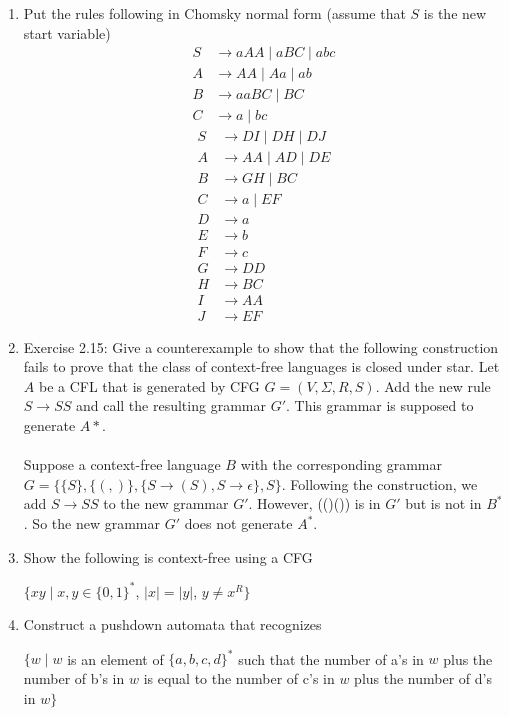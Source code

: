 \documentclass{article}
\begin{document}
\begin{enumerate}
        \item Put the rules following in Chomsky normal form (assume that $S$ is the new start variable)
            \begin{align*}
                S&\rightarrow aAA \mid aBC \mid abc\\
                A&\rightarrow AA \mid Aa \mid ab\\
                B&\rightarrow aaBC \mid BC\\
                C&\rightarrow a\mid bc
            \end{align*}
            \begin{align*}
                S&\rightarrow DI \mid DH \mid DJ\\
                A&\rightarrow AA \mid AD \mid DE\\
                B&\rightarrow GH \mid BC\\
                C&\rightarrow a \mid EF\\
                D&\rightarrow a\\
                E&\rightarrow b\\
                F&\rightarrow c\\
                G&\rightarrow DD\\
                H&\rightarrow BC\\
                I&\rightarrow AA\\
                J&\rightarrow EF
            \end{align*}
        \item Exercise 2.15: Give a counterexample to show that the following construction fails to prove that the class of context-free languages
            is closed under star. Let $A$ be a CFL that is generated by CFG $G=(V,\Sigma, R,S)$. Add the new rule $S\rightarrow SS$ and call the 
            resulting grammar $G'$. This grammar is supposed to generate $A*$.\\\\
            Suppose a context-free language $B$ with the corresponding grammar $G=\{\{S\}, \{(,)\}, \{S\rightarrow (S), S\rightarrow \epsilon\}, S\}$.
            Following the construction, we add $S\rightarrow SS$ to the new grammar $G'$. However, (()()) is in $G'$ but is not in $B^*$. So the new 
            grammar $G'$ does not generate $A^*$.

        \item Show the following is context-free using a CFG
            \begin{center}
                $\{xy \mid x,y\in \{0,1\}^*$, $ |x|=|y|$, $ y\not= x^R\}$
            \end{center}

        \item Construct a pushdown automata that recognizes
            \begin{center}
                $\{w\mid w $ is an element of $\{a,b,c,d\}^* $ such that the number of a's in $w$ plus the number of b's in $w$ is equal to the number 
                of c's in $w$ plus the number of d's in $w \}$
            \end{center}
    \end{enumerate}
\end{document}
